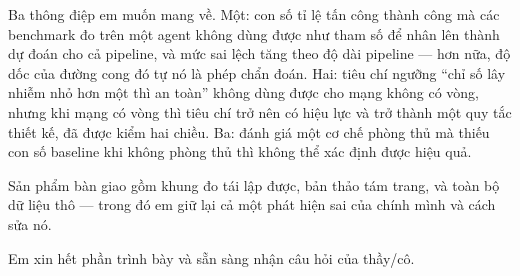 \documentclass[11pt,a4paper]{article}
\begin{document}
Ba thông điệp em muốn mang về. Một: con số tỉ lệ tấn công thành công mà các benchmark đo
trên một agent không dùng được như tham số để nhân lên thành dự đoán cho cả pipeline, và
mức sai lệch tăng theo độ dài pipeline --- hơn nữa, độ dốc của đường cong đó tự nó là
phép chẩn đoán. Hai: tiêu chí ngưỡng ``chỉ số lây nhiễm nhỏ hơn một thì an toàn'' không
dùng được cho mạng không có vòng, nhưng khi mạng có vòng thì tiêu chí trở nên có hiệu
lực và trở thành một quy tắc thiết kế, đã được kiểm hai chiều. Ba: đánh giá một cơ chế
phòng thủ mà thiếu con số baseline khi không phòng thủ thì không thể xác định được hiệu
quả.

Sản phẩm bàn giao gồm khung đo tái lập được, bản thảo tám trang, và toàn bộ dữ liệu thô
--- trong đó em giữ lại cả một phát hiện sai của chính mình và cách sửa nó.

Em xin hết phần trình bày và sẵn sàng nhận câu hỏi của thầy/cô.
\end{document}
